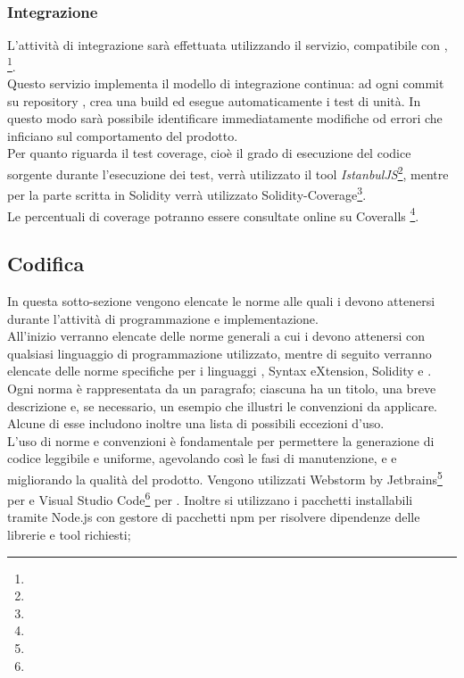 \documentclass[NormeDiProgetto.tex]{subfiles}
\begin{document}
\subsubsection{Integrazione}
L'attività di integrazione sarà effettuata utilizzando il servizio, compatibile con , \textit{}\footnote{}.\\
Questo servizio implementa il modello di integrazione continua: ad ogni commit su repository ,  crea una build ed esegue automaticamente i test di unità. In questo modo sarà possibile identificare immediatamente modifiche od errori che inficiano sul comportamento del prodotto.\\
Per quanto riguarda il test coverage, cioè il grado di esecuzione del codice sorgente durante l'esecuzione dei test, verrà utilizzato il tool  \textit{IstanbulJS}\footnote{}, mentre per la parte scritta in Solidity verrà utilizzato Solidity-Coverage\footnote{}.\\
Le percentuali di coverage potranno essere consultate online su Coveralls \footnote{}.

\subsection{Codifica}
In questa sotto-sezione vengono elencate le norme alle quali i \progri devono attenersi durante l'attività di programmazione e implementazione.\\
All'inizio verranno elencate delle norme generali a cui i \progri devono attenersi con qualsiasi linguaggio di programmazione utilizzato, mentre di seguito verranno elencate delle norme specifiche per i linguaggi ,  Syntax eXtension, Solidity e .\\
Ogni norma è rappresentata da un paragrafo; ciascuna ha un titolo, una breve descrizione e, se necessario, un esempio che illustri le convenzioni da applicare. Alcune di esse includono inoltre una lista di possibili eccezioni d'uso.\\
L'uso di norme e convenzioni è fondamentale per permettere la generazione di codice leggibile e uniforme, agevolando così le fasi di manutenzione,  e  e migliorando la qualità del prodotto.
Vengono utilizzati Webstorm by Jetbrains\footnote{} per  e Visual Studio Code\footnote{} per .
Inoltre si utilizzano i pacchetti installabili tramite Node.js con gestore di pacchetti npm per risolvere dipendenze delle librerie e tool richiesti;
\end{document}
